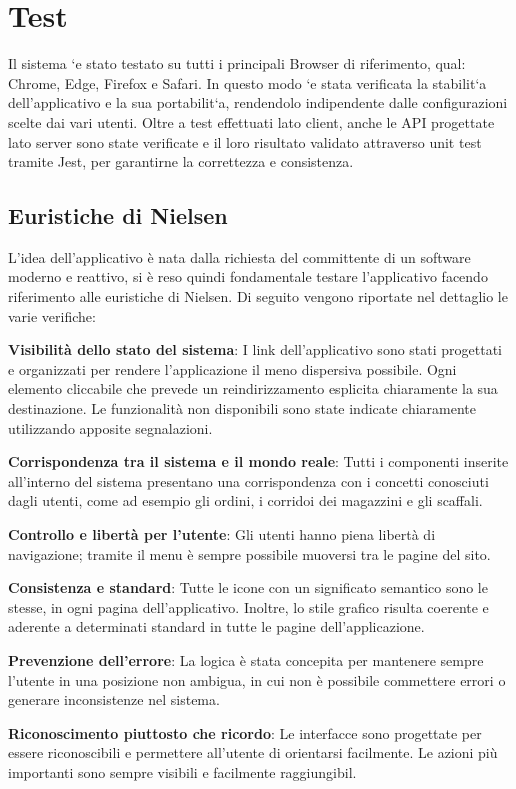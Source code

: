 \section{Test}
Il sistema `e stato testato su tutti i principali Browser di riferimento, qual: Chrome, Edge, Firefox e Safari. In questo modo `e stata verificata la stabilit`a dell’applicativo e la sua portabilit`a, rendendolo indipendente dalle configurazioni scelte dai vari utenti. Oltre a test effettuati lato client, anche le API progettate lato server sono state verificate e il loro risultato validato attraverso unit test tramite Jest, per garantirne la correttezza e consistenza.
\subsection{Euristiche di Nielsen}
L'idea dell'applicativo è nata dalla richiesta del committente di un software moderno e reattivo, si è reso quindi fondamentale testare l'applicativo facendo riferimento alle euristiche di Nielsen. Di seguito vengono riportate nel dettaglio le varie verifiche:

\textbf{Visibilità dello stato del sistema}: I link dell’applicativo sono stati progettati e organizzati per rendere l’applicazione il meno dispersiva possibile. Ogni elemento cliccabile che prevede un reindirizzamento esplicita chiaramente la sua destinazione. Le funzionalità non disponibili sono state indicate chiaramente utilizzando apposite segnalazioni.

\textbf{Corrispondenza tra il sistema e il mondo reale}: Tutti i componenti inserite all’interno del sistema presentano una corrispondenza con i concetti conosciuti dagli utenti, come ad esempio gli ordini, i corridoi dei magazzini e gli scaffali.

\textbf{Controllo e libertà per l’utente}: Gli utenti hanno piena libertà di navigazione; tramite il menu è sempre possibile muoversi tra le pagine del sito.

\textbf{Consistenza e standard}: Tutte le icone con un significato semantico sono le stesse, in ogni pagina dell'applicativo. Inoltre, lo stile grafico risulta coerente e aderente a determinati standard in tutte le pagine dell’applicazione.

\textbf{Prevenzione dell’errore}: La logica è stata concepita per mantenere sempre l’utente in una posizione non ambigua, in cui non è possibile commettere errori o generare inconsistenze nel sistema.

\textbf{Riconoscimento piuttosto che ricordo}: Le interfacce sono progettate per essere riconoscibili e permettere all’utente di orientarsi facilmente. Le azioni più importanti sono sempre visibili e facilmente raggiungibil.

